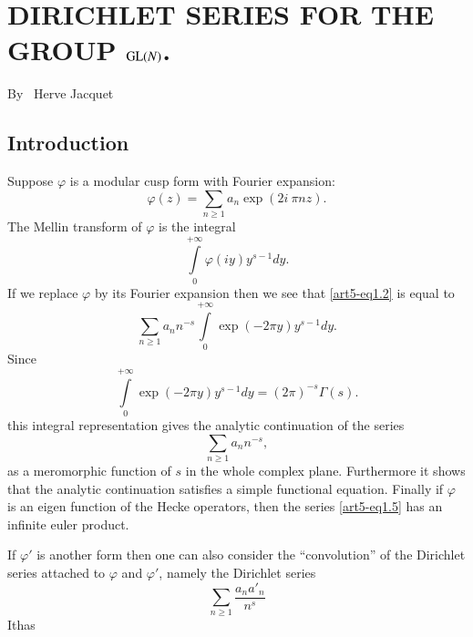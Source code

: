 \chapter{DIRICHLET SERIES FOR THE GROUP $\mathrm{GL}(N)$.}\label{art-5}

\begin{center}
{\large By~ Herve Jacquet}
\end{center}

\bigskip

\setcounter{pageoriginal}{154}
\section{Introduction}\label{art5-sec1}
\pageoriginale
Suppose $\varphi$ is a modular cusp form with Fourier expansion:
\begin{equation*}
\varphi(z)=\sum\limits_{n\geq 1}a_{n}\exp(2i\ \pi n z).\tag{1.1}\label{art5-eq1.1}
\end{equation*}
The Mellin transform of $\varphi$ is the integral
\begin{equation*}
\int\limits^{+\infty}_{0}\varphi(iy)y^{s-1}dy.\tag{1.2}\label{art5-eq1.2}
\end{equation*}
If we replace $\varphi$ by its Fourier expansion then we see that \eqref{art5-eq1.2} is equal to
\begin{equation*}
\sum\limits_{n\geq 1}a_{n}n^{-s}\int\limits^{+\infty}_{0}\exp (-2\pi y)y^{s-1}dy.\tag{1.3}\label{art5-eq1.3}
\end{equation*}
Since
\begin{equation*}
\int\limits_{0}^{+\infty}\exp(-2\pi y)y^{s-1}dy=(2\pi)^{-s}\Gamma(s).\tag{1.4}\label{art5-eq1.4}
\end{equation*}
this integral representation gives the analytic continuation of the series
\begin{equation*}
\sum\limits_{n\geq 1} a_{n}n^{-s},\tag{1.5}\label{art5-eq1.5}
\end{equation*}
as a meromorphic function of $s$ in the whole complex plane. Furthermore it shows that the analytic continuation satisfies a simple functional equation. Finally if $\varphi$ is an eigen function of the Hecke operators, then the series \eqref{art5-eq1.5} has an infinite euler product.

If $\varphi'$ is another form then one can also consider the ``convolution'' of the Dirichlet series attached to $\varphi$ and $\varphi'$, namely the Dirichlet series
\begin{equation*}
\sum\limits_{n\geq 1} \frac{a_{n}a'_{n}}{n^{s}}\tag{1.6}\label{art5-eq1.6}
\end{equation*}
It\pageoriginale has 
